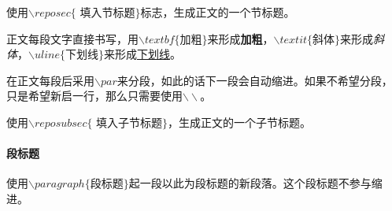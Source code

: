 使用$\backslash reposec\{$ 填入节标题$\}$标志，生成正文的一个节标题。\par
正文每段文字直接书写，用$\backslash textbf\{$加粗$\}$来形成\textbf{加粗}，$\backslash textit\{$斜体$\}$来形成\textit{斜体}，$\backslash uline\{$下划线$\}$来形成\uline{下划线}。\par
在正文每段后采用$\backslash par$来分段，如此的话下一段会自动缩进。如果不希望分段，只是希望新启一行，那么只需要使用$\backslash\backslash$。\par
{}
使用$\backslash reposubsec\{$ 填入子节标题$\}$，生成正文的一个子节标题。\par
\paragraph{段标题}使用$\backslash paragraph\{$段标题$\}$起一段以此为段标题的新段落。这个段标题不参与缩进。\par
